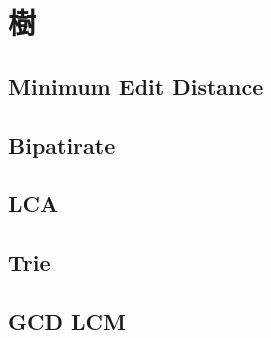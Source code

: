 \section{樹}
    \subsection{Minimum Edit Distance}
        
    \subsection{Bipatirate}
        
    \subsection{LCA}
        
    \subsection{Trie}
        
    \subsection{GCD LCM}
        
    
